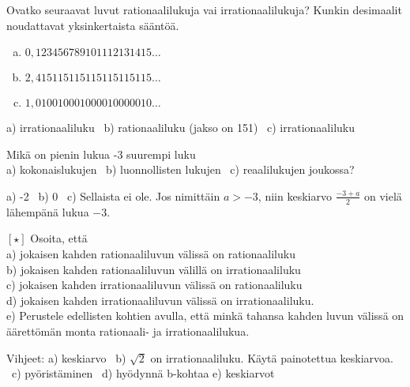 \begin{tehtava}
Ovatko seuraavat luvut rationaalilukuja vai irrationaalilukuja? Kunkin desimaalit
noudattavat yksinkertaista sääntöä.
\begin{enumerate}[a)]
\item $0,123456789101112131415 \ldots$
\item $2,415115115115115115115 \ldots$
\item $1,010010001000010000010 \ldots$
\end{enumerate}
\begin{vastaus}
a) irrationaaliluku \ b) rationaaliluku (jakso on 151) \ c) irrationaaliluku
\end{vastaus}
\end{tehtava}

\begin{tehtava}
Mikä on pienin lukua -3 suurempi luku \\
a) kokonaislukujen \ b) luonnollisten lukujen \ c) reaalilukujen joukossa?
\begin{vastaus}
a) -2 \ b) 0 \ c) Sellaista ei ole. Jos nimittäin $a > -3$, niin keskiarvo
$\frac{-3+a}{2}$ on vielä lähempänä lukua $-3$. 
\end{vastaus}
\end{tehtava}

\begin{tehtava}
$\boldsymbol{[\star]}$ Osoita, että \\
a) jokaisen kahden rationaaliluvun välissä on rationaaliluku \\
b) jokaisen kahden rationaaliluvun välillä on irrationaaliluku \\
c) jokaisen kahden irrationaaliluvun välissä on rationaaliluku \\
d) jokaisen kahden irrationaaliluvun välissä on irrationaaliluku. \\
e) Perustele edellisten kohtien avulla, että minkä tahansa kahden luvun
välissä on äärettömän monta rationaali- ja irrationaalilukua.
\begin{vastaus}
Vihjeet: a) keskiarvo \ b) $\sqrt{2}$ on irrationaaliluku. Käytä
painotettua keskiarvoa. \ c) pyöristäminen \ d) hyödynnä b-kohtaa
e) keskiarvot
\end{vastaus}
\end{tehtava}
